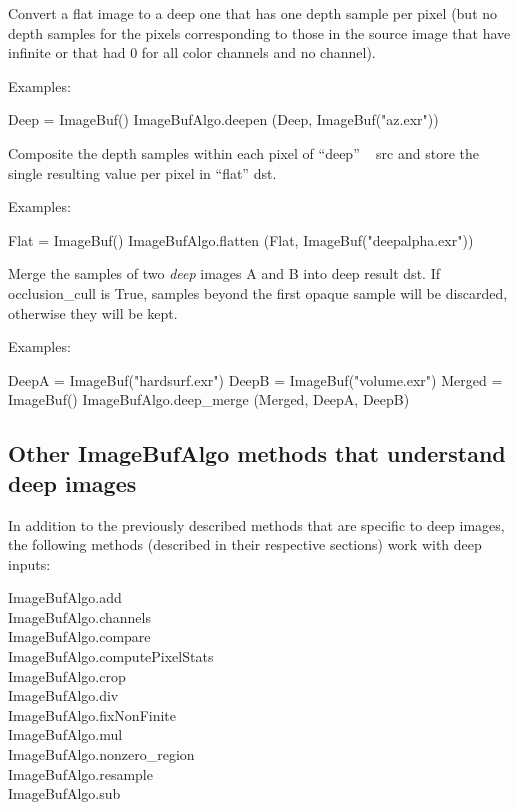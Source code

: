 Convert a flat image to a deep one that has one depth sample per pixel
(but no depth samples for the pixels corresponding to those in the source
image that have infinite  or that had 0 for all color channels and no
 channel).

\smallskip
\noindent Examples:
\begin{code}
    Deep = ImageBuf()
    ImageBufAlgo.deepen (Deep, ImageBuf("az.exr"))
\end{code}
\apiend


  

Composite the depth samples within each pixel of ``deep'' \ImageBuf\ {\cf
src} and store the single  resulting value per pixel in ``flat'' \ImageBuf
{\cf dst}.

\smallskip
\noindent Examples:
\begin{code}
    Flat = ImageBuf()
    ImageBufAlgo.flatten (Flat, ImageBuf("deepalpha.exr"))
\end{code}
\apiend

  

Merge the samples of two \emph{deep} images {\cf A} and {\cf B} into deep
result {\cf dst}. If {\cf occlusion_cull} is {\cf True}, samples beyond
the first opaque sample will be discarded, otherwise they will be kept.

\smallskip
\noindent Examples:
\begin{code}
    DeepA = ImageBuf("hardsurf.exr")
    DeepB = ImageBuf("volume.exr")
    Merged = ImageBuf()
    ImageBufAlgo.deep_merge (Merged, DeepA, DeepB)
\end{code}
\apiend

\subsection*{Other ImageBufAlgo methods that understand deep images}

In addition to the previously described methods that are specific to
deep images, the following \ImageBufAlgo methods (described in their
respective sections) work with deep inputs:

\medskip

\noindent
{\cf ImageBufAlgo.add} \\
{\cf ImageBufAlgo.channels} \\
{\cf ImageBufAlgo.compare} \\
{\cf ImageBufAlgo.computePixelStats} \\
{\cf ImageBufAlgo.crop} \\
{\cf ImageBufAlgo.div} \\
{\cf ImageBufAlgo.fixNonFinite} \\
{\cf ImageBufAlgo.mul} \\
{\cf ImageBufAlgo.nonzero_region} \\
{\cf ImageBufAlgo.resample} \\
{\cf ImageBufAlgo.sub} \\


